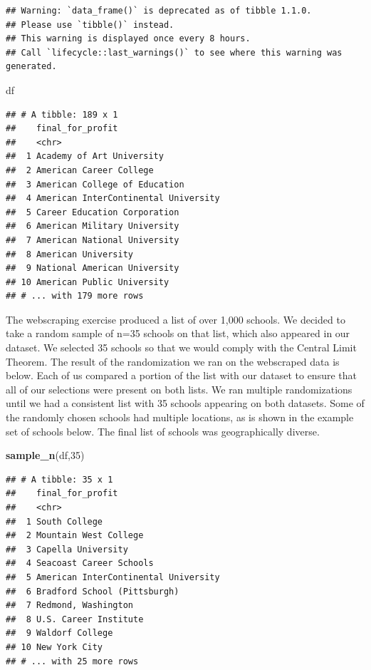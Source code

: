 \documentclass[
]{article}
\newenvironment{Shaded}{\begin{snugshade}}{\end{snugshade}}
\newcommand{\DecValTok}[1]{\textcolor[rgb]{0.00,0.00,0.81}{#1}}
\newcommand{\KeywordTok}[1]{\textcolor[rgb]{0.13,0.29,0.53}{\textbf{#1}}}
\newcommand{\NormalTok}[1]{#1}
\begin{document}
\begin{verbatim}
## Warning: `data_frame()` is deprecated as of tibble 1.1.0.
## Please use `tibble()` instead.
## This warning is displayed once every 8 hours.
## Call `lifecycle::last_warnings()` to see where this warning was generated.
\end{verbatim}

\begin{Shaded}
\begin{Highlighting}[]
\NormalTok{df}
\end{Highlighting}
\end{Shaded}

\begin{verbatim}
## # A tibble: 189 x 1
##    final_for_profit                    
##    <chr>                               
##  1 Academy of Art University           
##  2 American Career College             
##  3 American College of Education       
##  4 American InterContinental University
##  5 Career Education Corporation        
##  6 American Military University        
##  7 American National University        
##  8 American University                 
##  9 National American University        
## 10 American Public University          
## # ... with 179 more rows
\end{verbatim}

The webscraping exercise produced a list of over 1,000 schools. We
decided to take a random sample of n=35 schools on that list, which also
appeared in our dataset. We selected 35 schools so that we would comply
with the Central Limit Theorem. The result of the randomization we ran
on the webscraped data is below. Each of us compared a portion of the
list with our dataset to ensure that all of our selections were present
on both lists. We ran multiple randomizations until we had a consistent
list with 35 schools appearing on both datasets. Some of the randomly
chosen schools had multiple locations, as is shown in the example set of
schools below. The final list of schools was geographically diverse.

\begin{Shaded}
\begin{Highlighting}[]
\KeywordTok{sample_n}\NormalTok{(df,}\DecValTok{35}\NormalTok{)}
\end{Highlighting}
\end{Shaded}

\begin{verbatim}
## # A tibble: 35 x 1
##    final_for_profit                    
##    <chr>                               
##  1 South College                       
##  2 Mountain West College               
##  3 Capella University                  
##  4 Seacoast Career Schools             
##  5 American InterContinental University
##  6 Bradford School (Pittsburgh)        
##  7 Redmond, Washington                 
##  8 U.S. Career Institute               
##  9 Waldorf College                     
## 10 New York City                       
## # ... with 25 more rows
\end{verbatim}
\end{document}
